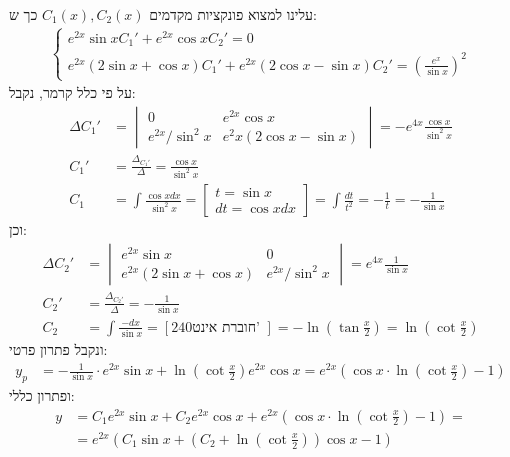 \documentclass{article}
\begin{document}
עלינו למצוא פונקציות מקדמים $C_1(x), C_2(x)$ כך ש:
\begin{align*}
    \begin{cases}
        e^{2x}\sin x C_1' + e^{2x}\cos x C_2' = 0 \\
        e^{2x}(2\sin x + \cos x) C_1' + e^{2x}(2\cos x - \sin x) C_2' = (\frac{e^x}{\sin x})^2
    \end{cases}
\end{align*}
על פי כלל קרמר, נקבל:
\begin{align*}
    \Delta{C_1'} & =\begin{vmatrix}
                        0                & e^{2x}\cos x           \\
                        e^{2x} / \sin^2x & e^2x(2\cos x - \sin x)
                    \end{vmatrix} = -e^{4x} \frac{\cos x}{\sin^2x}                                                             \\
    C_1'         & =\frac{\Delta_{C_1'}}{\Delta} = \frac{\cos x}{\sin^2 x}                                                     \\
    C_1          & = \int \frac{\cos x dx}{\sin ^2 x} = \begin{bmatrix}
                                                            t = \sin x \\
                                                            dt = \cos x dx
                                                        \end{bmatrix} = \int \frac{dt}{t^2} = -\frac{1}{t} = -\frac{1}{\sin x}
\end{align*}
וכן:
\begin{align*}
    \Delta{C_2'} & =\begin{vmatrix}
                        e^{2x}\sin x             & 0                \\
                        e^{2x}(2\sin x + \cos x) & e^{2x} / \sin^2x
                    \end{vmatrix} = e^{4x} \frac{1}{\sin x}                                                       \\
    C_2'         & =\frac{\Delta_{C_2'}}{\Delta} = -\frac{1}{\sin x}                                                  \\
    C_2          & = \int \frac{-dx}{\sin x} = [240 \text{חוברת אינט' }] = -\ln(\tan\frac x 2) = \ln (\cot \frac x 2)
\end{align*}
ונקבל פתרון פרטי:
\begin{align*}
    y_p & = -\frac{1}{\sin x}\cdot e^{2x}\sin x + \ln(\cot \frac{x}{2}) e^{2x} \cos x =
    e^{2x}(\cos x \cdot \ln(\cot \frac{x}{2}) - 1)
\end{align*}
ופתרון כללי:
\begin{align*}
    y & = C_1 e^{2x}\sin x + C_2 e^{2x}\cos x + e^{2x}(\cos x \cdot \ln(\cot \frac{x}{2}) - 1) = \\
      & = e^{2x}(C_1\sin x + (C_2 + \ln(\cot \frac{x}{2}))\cos x - 1)
\end{align*}
\end{document}
